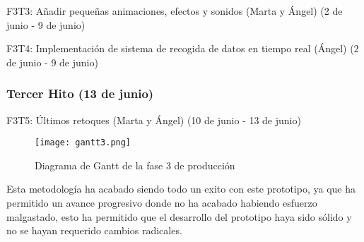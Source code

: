 \begin{compactitem}
\item F3T3: Añadir pequeñas animaciones, efectos y sonidos (Marta y Ángel) (2 de junio - 9 de junio)
\item F3T4: Implementación de sistema de recogida de datos en tiempo real (Ángel) (2 de junio - 9 de junio)
\end{compactitem}

\subsubsection{Tercer Hito (13 de junio)}

\begin{compactitem}
  \item F3T5: Últimos retoques (Marta y Ángel) (10 de junio - 13 de junio)
\end{compactitem}

\begin{figure}[H]
  \centering
	\texttt{[image: gantt3.png]}
  \caption{Diagrama de Gantt de la fase 3 de producción}
  \label{fig:fase3gantt}
\end{figure}

Esta metodología ha acabado siendo todo un exito con este prototipo, ya que ha permitido un avance progresivo donde no ha acabado habiendo esfuerzo malgastado, esto ha permitido que el desarrollo del prototipo haya sido sólido y no se hayan requerido cambios radicales.